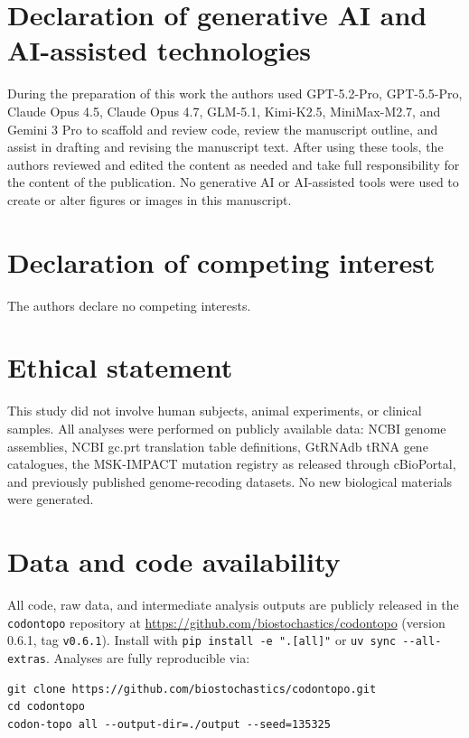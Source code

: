 \documentclass[preprint,11pt,authoryear,a4paper]{elsarticle}
\begin{document}
\section{Declaration of generative AI and AI-assisted technologies}

During the preparation of this work the authors used GPT-5.2-Pro,
GPT-5.5-Pro, Claude Opus 4.5, Claude Opus 4.7, GLM-5.1, Kimi-K2.5,
MiniMax-M2.7, and Gemini 3 Pro to scaffold and review code, review the
manuscript outline, and assist in drafting and revising the manuscript
text. After using these tools, the authors reviewed and edited the
content as needed and take full responsibility for the content of the
publication. No generative AI or AI-assisted tools were used to create
or alter figures or images in this manuscript.

\section{Declaration of competing interest}

The authors declare no competing interests.

\section{Ethical statement}

This study did not involve human subjects, animal experiments, or
clinical samples. All analyses were performed on publicly available
data: NCBI genome assemblies, NCBI gc.prt translation table definitions,
GtRNAdb tRNA gene catalogues, the MSK-IMPACT mutation registry as
released through cBioPortal, and previously published genome-recoding
datasets. No new biological materials were generated.

\section{Data and code availability}

All code, raw data, and intermediate analysis outputs are publicly
released in the \texttt{codontopo} repository at
\url{https://github.com/biostochastics/codontopo} (version 0.6.1, tag
\texttt{v0.6.1}). Install with \texttt{pip\ install\ -e\ ".{[}all{]}"}
or \texttt{uv\ sync\ -\/-all-extras}. Analyses are fully reproducible
via:

\begin{verbatim}
git clone https://github.com/biostochastics/codontopo.git
cd codontopo
codon-topo all --output-dir=./output --seed=135325
\end{verbatim}
\end{document}
